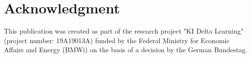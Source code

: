 \documentclass[letterpaper, 10 pt, conference]{ieeeconf}
\begin{document}
\addtolength{\textheight}{-4.8cm}














\section*{Acknowledgment}
This publication was created as part of the research project "KI Delta Learning" (project number: 19A19013A) funded by the Federal Ministry for Economic Affairs and Energy (BMWi) on the basis of a decision by the German Bundestag.

\clearpage


\end{document}
